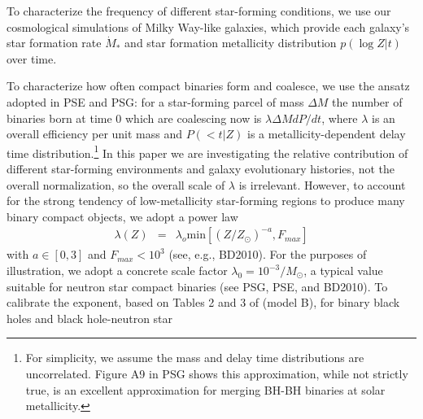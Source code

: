 \documentclass[nofootinbib,twocolumn,prd]{emulateapj}
\newcommand\abbrvPSgrb{PSG}
\newcommand\abbrvPSellipticals{PSE}
\newcommand\abbrvKBLowZa{BD2010}
\begin{document}
To characterize the frequency of different star-forming conditions, we use our cosmological simulations of Milky Way-like galaxies, which provide each galaxy's star formation rate
$\dot{M}_*$ and star formation metallicity distribution $p(\log Z|t)$ over time.

To characterize how often compact binaries form and coalesce, we use the ansatz adopted in \abbrvPSellipticals{} and
\abbrvPSgrb{}: for a star-forming parcel of mass $\Delta M$ the number of binaries born at time $0$ which
are coalescing now is $\lambda \Delta M dP/dt$, where $\lambda$ is an overall efficiency per unit mass and $P(<t|Z)$ is
a metallicity-dependent delay time distribution.\footnote{For simplicity, we assume the mass and delay time
  distributions are uncorrelated.  Figure A9 in \abbrvPSgrb{} shows this approximation, while not strictly true, is an
  excellent approximation for merging BH-BH binaries at solar metallicity.  }
    In this paper we are investigating the relative contribution of
different star-forming environments and galaxy evolutionary histories, not the overall normalization, so the overall scale of $\lambda$ is irrelevant.  
However, to account for the strong tendency of low-metallicity star-forming regions to produce many binary compact
objects, we adopt a power law
\begin{eqnarray}
\label{eq:LambdaVersusZModel}
\lambda(Z) &=& \lambda_o \text{min}[(Z/Z_\odot)^{-a}, F_{max}] 
\end{eqnarray}
with $a\in [0,3]$ and $F_{max}<10^3$
 (see, e.g.\cite{popsyn-LIGO-SFR-2008}, \abbrvKBLowZa).  For the purposes of illustration, we adopt a  concrete scale
factor  $\lambda_0 = 10^{-3}/M_\odot $,  a typical value suitable for neutron star compact binaries (see \abbrvPSgrb{},
\abbrvPSellipticals, and \abbrvKBLowZa).
To calibrate the exponent, based on Tables 2 and 3 of
\cite{popsyn-LowMetallicityImpact2-StarTrackRevised-2012} (model B), for binary black holes and black hole-neutron star
\end{document}
